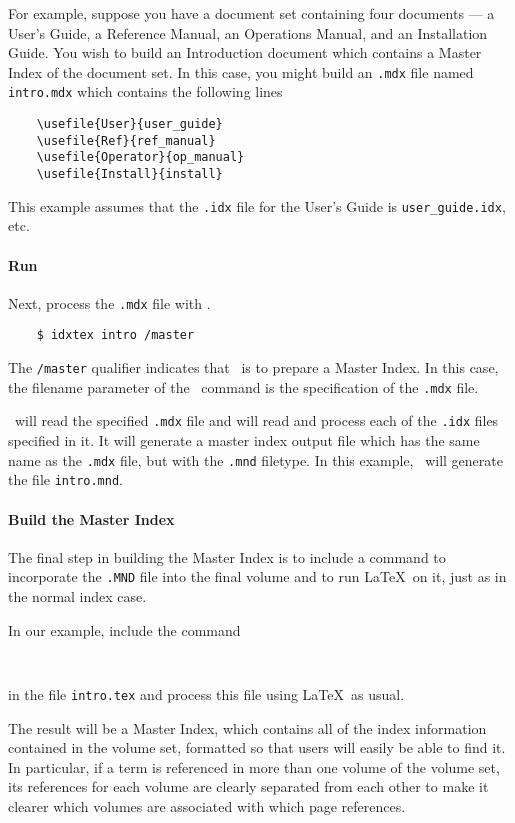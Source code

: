 For example, suppose you have a document set containing four documents ---
a User's Guide, a Reference Manual, an Operations Manual, and an Installation
Guide.  You wish to build an Introduction document which contains a Master
Index of the document set.  In this case, you might build an {\tt \verb+.mdx+} file
named {\tt intro.mdx} which contains the following lines
\begin{verbatim}
    \usefile{User}{user_guide}
    \usefile{Ref}{ref_manual}
    \usefile{Operator}{op_manual}
    \usefile{Install}{install}
\end{verbatim}
This example assumes that the {\tt .idx} file for the User's Guide is
{\tt user\_guide.idx}, etc.  

\paragraph{Run \IdxTeX}
  Next, process the {\tt \verb+.mdx+} file with
\IdxTeX.
\begin{verbatim}
    $ idxtex intro /master
\end{verbatim}
The \verb+/master+  qualifier indicates that \IdxTeX\ is to prepare a Master Index.
In this case, the filename parameter of the
\IdxTeX\ command is the specification of the {\tt .mdx} file.  

\IdxTeX\ will read the specified {\tt .mdx} file and will read and process
each of the {\tt .idx} files specified in it.  It will generate a master
index output file which has the same name as the {\tt .mdx} file, but with
the {\tt .mnd} filetype.  In this example, \IdxTeX\ will generate the file
{\tt intro.mnd}.

\paragraph{Build the   Master Index} 
 The final step in building the Master Index is
to include a \verb++ command to incorporate the {\tt .MND} file into the
final volume and to run \LaTeX\ on it, just as in the normal index case.

In our example, include the command
\begin{verbatim}
    
\end{verbatim}
in the file {\tt intro.tex} and process this file using \LaTeX\ as usual.

The result will be a Master Index, which contains all of the index information
contained in the volume set, formatted so that users will easily be able to
find it.  In particular, if a term is referenced in more than one volume of
the volume set, its references for each volume are clearly separated from each
other to make it clearer which volumes are associated with which page 
references.





